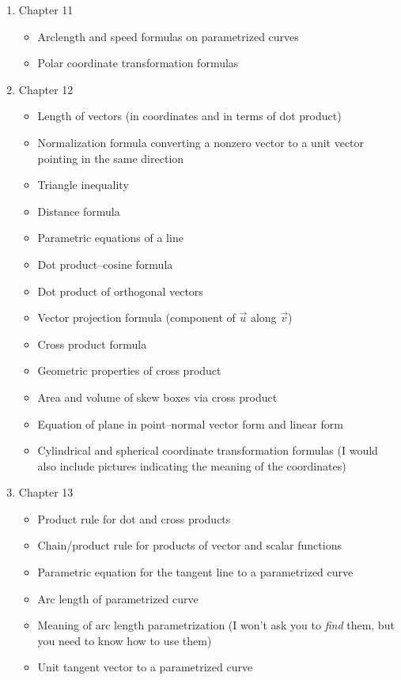 \documentclass[12pt]{amsart}
\begin{document}
\begin{enumerate}
\item Chapter 11
\begin{itemize}
    \item Arclength and speed formulas on parametrized curves
    \item Polar coordinate transformation formulas
\end{itemize}
\item Chapter 12
\begin{itemize}
    \item Length of vectors (in coordinates and in terms of dot product)
    \item Normalization formula converting a nonzero vector to a unit vector pointing in the same direction
    \item Triangle inequality
    \item Distance formula
    \item Parametric equations of a line
    \item Dot product--cosine formula
    \item Dot product of orthogonal vectors
    \item Vector projection formula (component of $\vec{u}$ along $\vec{v}$)
    \item Cross product formula
    \item Geometric properties of cross product
    \item Area and volume of skew boxes via cross product
    \item Equation of plane in point--normal vector form and linear form
    \item Cylindrical and spherical coordinate transformation formulas (I would also include pictures indicating the meaning of the coordinates)
\end{itemize}
\item Chapter 13
\begin{itemize}
    \item Product rule for dot and cross products
    \item Chain/product rule for products of vector and scalar functions
    \item Parametric equation for the tangent line to a parametrized curve
    \item Arc length of parametrized curve
    \item Meaning of arc length parametrization (I won't ask you to \emph{find} them, but you need to know how to use them)
    \item Unit tangent vector to a parametrized curve

\end{itemize}
\end{enumerate}
\end{document}

